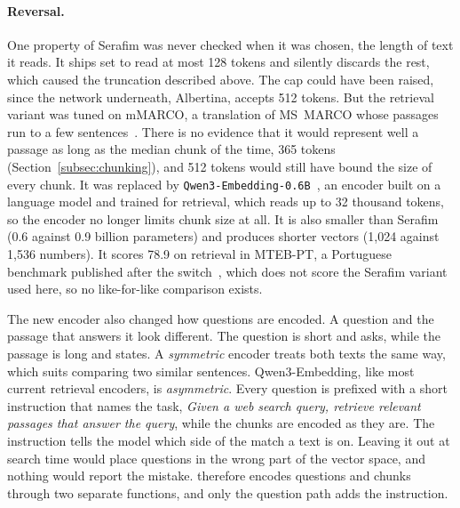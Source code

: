 \paragraph{Reversal.} One property of Serafim was never checked when it was
chosen, the length of text it reads. It ships set to read at most 128 tokens and silently discards the rest, which
caused the truncation described above. The cap could have been raised, since
the network underneath, Albertina, accepts 512 tokens. But the retrieval
variant was tuned on mMARCO, a translation of MS~MARCO whose passages run to a
few sentences~\citep{gomes2024serafim}. There is no evidence that it would
represent well a passage as long as the median chunk of the time, 365 tokens
(Section~\ref{subsec:chunking}), and 512 tokens would still have bound the size
of every chunk. It was replaced by
\texttt{Qwen3-Embedding-0.6B}~\citep{zhang2025qwen3embedding}, an encoder
built on a language model and trained for retrieval, which reads up to 32
thousand tokens, so the encoder no longer limits chunk size at all. It is also
smaller than Serafim (0.6 against 0.9 billion parameters) and produces shorter
vectors (1{,}024 against 1{,}536 numbers). It scores 78.9 on retrieval in MTEB-PT, a Portuguese
benchmark published after the switch~\citep{okamura2026mtebpt}, which does not
score the Serafim variant used here, so no like-for-like comparison exists.

The new encoder also changed how questions are encoded. A question and the
passage that answers it look different. The question is short and asks, while
the passage is long and states. A \emph{symmetric} encoder treats both texts
the same way, which suits comparing two similar sentences. Qwen3-Embedding,
like most current retrieval encoders, is \emph{asymmetric}. Every question is
prefixed with a short instruction that names the task, \textit{Given a web
search query, retrieve relevant passages that answer the query}, while the
chunks are encoded as they are. The instruction tells the model which side of
the match a text is on. Leaving it out at search time would place questions
in the wrong part of the vector space, and nothing would report the mistake.
\sysname{} therefore encodes questions and chunks through two separate
functions, and only the question path adds the instruction.

